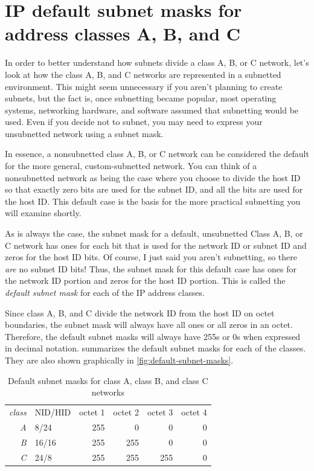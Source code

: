 \section{IP default subnet masks for address classes A, B, and C}

In order to better understand how subnets divide a class A, B, or C network, let's
look at how the class A, B, and C networks are represented in a
subnetted environment. This might seem unnecessary if you aren't
planning to create subnets, but the fact is, once subnetting became
popular, most operating systems, networking hardware, and software
assumed that subnetting would be used. Even if you decide not to subnet,
you may need to express your unsubnetted network using a subnet mask.

In essence, a nonsubnetted class A, B, or C network can be considered
the default for the more general, custom-subnetted network. You can
think of a nonsubnetted network as being the case where you choose to
divide the host ID so that exactly zero bits are used for the subnet ID,
and all the bits are used for the host ID. This default case is the
basis for the more practical subnetting you will examine shortly.

As is always the case, the subnet mask for a default, unsubnetted Class
A, B, or C network has ones for each bit that is used for the network ID
or subnet ID and zeros for the host ID bits. Of course, I just said you
aren't subnetting, so there {\emph{are}} no subnet ID bits! Thus, the
subnet mask for this default case has ones for the network ID portion
and zeros for the host ID portion. This is called the {\emph{default
subnet mask}} for each of the IP address classes.

Since class A, B, and C divide the network ID from the host ID on octet
boundaries, the subnet mask will always have all ones or all zeros in an
octet. Therefore, the default subnet masks will always have 255s or 0s
when expressed in decimal notation.
 summarizes the default subnet masks for each of the classes.
They are also shown graphically in \cref{fig:default-subnet-masks}.


\begin{table}
   \centering
   \begin{tabular}{rlrrrr}
   \textit{class} & NID/HID & octet 1 & octet 2 & octet 3 & octet 4 \\[1ex]
   \textit{A}     & 8/24    & 255     & 0       & 0       & 0       \\
   \textit{B}     & 16/16   & 255     & 255     & 0       & 0       \\
   \textit{C}     & 24/8    & 255     & 255     & 255     & 0       \\
   \end{tabular}
   \caption{Default subnet masks for class A, class B, and class C networks}
   \label{tab:default-subnet-masks}
\end{table}



